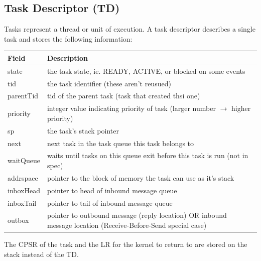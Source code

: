 \documentclass[12pt]{article}
\begin{document}
\subsection{Task Descriptor (TD)}
Tasks represent a thread or unit of execution.  A task descriptor describes a single task and stores the following information:
\begin{center}
  \begin{tabular}{|l|l|}
    \hline
    {\bf Field} & {\bf Description} \\\hline
    state & the task state, ie. READY, ACTIVE, or blocked on some events \\\hline
    tid & the task identifier (these aren't reusued) \\\hline
    parentTid & tid of the parent task (task that created thsi one) \\\hline
    priority & integer value indicating priority of task (larger number $\rightarrow$ higher priority) \\\hline
    sp & the task's stack pointer \\\hline
    next & next task in the task queue this task belongs to \\\hline
    waitQueue & waits until tasks on this queue exit before this task is run (not in spec) \\\hline
    addrspace & pointer to the block of memory the task can use as it's stack \\\hline
    inboxHead & pointer to head of inbound message queue \\\hline
    inboxTail & pointer to tail of inbound message queue \\\hline
    outbox & pointer to outbound message (reply location) OR inbound message location (Receive-Before-Send special case) \\\hline
  \end{tabular}
\end{center}
The CPSR of the task and the LR for the kernel to return to are stored on the stack instead of the TD.
\end{document}
